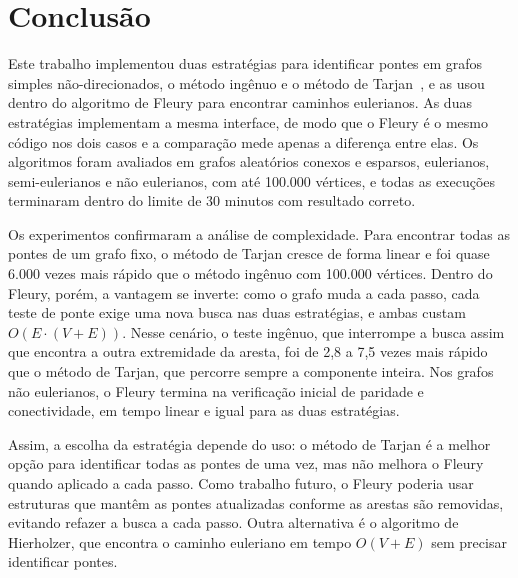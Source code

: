 \section{Conclusão}

Este trabalho implementou duas estratégias para identificar pontes em grafos simples não-direcionados, o método ingênuo e o método de Tarjan~\cite{tarjan1974}, e as usou dentro do algoritmo de Fleury para encontrar caminhos eulerianos. As duas estratégias implementam a mesma interface, de modo que o Fleury é o mesmo código nos dois casos e a comparação mede apenas a diferença entre elas. Os algoritmos foram avaliados em grafos aleatórios conexos e esparsos, eulerianos, semi-eulerianos e não eulerianos, com até 100.000 vértices, e todas as execuções terminaram dentro do limite de 30 minutos com resultado correto.

Os experimentos confirmaram a análise de complexidade. Para encontrar todas as pontes de um grafo fixo, o método de Tarjan cresce de forma linear e foi quase 6.000 vezes mais rápido que o método ingênuo com 100.000 vértices. Dentro do Fleury, porém, a vantagem se inverte: como o grafo muda a cada passo, cada teste de ponte exige uma nova busca nas duas estratégias, e ambas custam $O(E \cdot (V + E))$. Nesse cenário, o teste ingênuo, que interrompe a busca assim que encontra a outra extremidade da aresta, foi de 2,8 a 7,5 vezes mais rápido que o método de Tarjan, que percorre sempre a componente inteira. Nos grafos não eulerianos, o Fleury termina na verificação inicial de paridade e conectividade, em tempo linear e igual para as duas estratégias.

Assim, a escolha da estratégia depende do uso: o método de Tarjan é a melhor opção para identificar todas as pontes de uma vez, mas não melhora o Fleury quando aplicado a cada passo. Como trabalho futuro, o Fleury poderia usar estruturas que mantêm as pontes atualizadas conforme as arestas são removidas, evitando refazer a busca a cada passo. Outra alternativa é o algoritmo de Hierholzer, que encontra o caminho euleriano em tempo $O(V + E)$ sem precisar identificar pontes.
